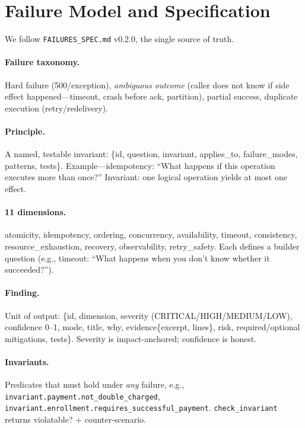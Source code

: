 \section{Failure Model and Specification}
We follow \texttt{FAILURES\_SPEC.md} v0.2.0, the single source of truth.

\paragraph{Failure taxonomy.} Hard failure (500/exception), \emph{ambiguous outcome} (caller does not know if side effect happened---timeout, crash before ack, partition), partial success, duplicate execution (retry/redelivery).

\paragraph{Principle.} A named, testable invariant: \{id, question, invariant, applies\_to, failure\_modes, patterns, tests\}. Example---idempotency: ``What happens if this operation executes more than once?'' Invariant: one logical operation yields at most one effect.

\paragraph{11 dimensions.} atomicity, idempotency, ordering, concurrency, availability, timeout, consistency, resource\_exhaustion, recovery, observability, retry\_safety. Each defines a builder question (e.g., timeout: ``What happens when you don't know whether it succeeded?'').

\paragraph{Finding.} Unit of output: \{id, dimension, severity (CRITICAL/HIGH/MEDIUM/LOW), confidence 0--1, mode, title, why, evidence\{excerpt, lines\}, risk, required/optional mitigations, tests\}. Severity is impact-anchored; confidence is honest.

\paragraph{Invariants.} Predicates that must hold under \emph{any} failure, e.g., \texttt{invariant.payment.not\_double\_charged}, \texttt{invariant.enrollment.requires\_successful\_payment}. \texttt{check\_invariant} returns violatable? + counter-scenario.
